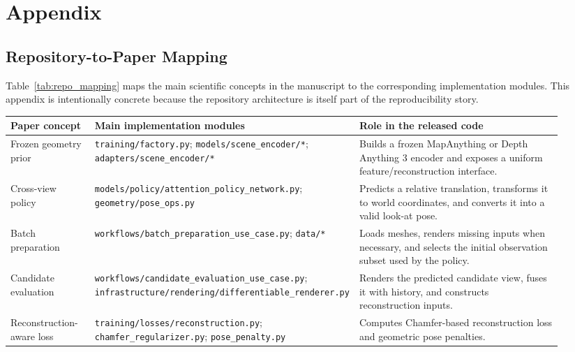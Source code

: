 \section{Appendix}
\label{sec:appendix}

\subsection{Repository-to-Paper Mapping}
\label{sec:repo_mapping}

Table~\ref{tab:repo_mapping} maps the main scientific concepts in the manuscript to the corresponding implementation modules. This appendix is intentionally concrete because the repository architecture is itself part of the reproducibility story.

\begin{table}[h]
    \centering
    \scriptsize
    \begin{tabular}{>{\raggedright\arraybackslash}p{0.16\linewidth} >{\raggedright\arraybackslash}p{0.29\linewidth} >{\raggedright\arraybackslash}p{0.47\linewidth}}
        \toprule
        Paper concept & Main implementation modules & Role in the released code \\
        \midrule
        Frozen geometry prior & \texttt{training/factory.py}; \texttt{models/scene\_encoder/*}; \texttt{adapters/scene\_encoder/*} & Builds a frozen MapAnything or Depth Anything 3 encoder and exposes a uniform feature/reconstruction interface. \\
        Cross-view policy & \texttt{models/policy/attention\_policy\_network.py}; \texttt{geometry/pose\_ops.py} & Predicts a relative translation, transforms it to world coordinates, and converts it into a valid look-at pose. \\
        Batch preparation & \texttt{workflows/batch\_preparation\_use\_case.py}; \texttt{data/*} & Loads meshes, renders missing inputs when necessary, and selects the initial observation subset used by the policy. \\
        Candidate evaluation & \texttt{workflows/candidate\_evaluation\_use\_case.py}; \texttt{infrastructure/rendering/differentiable\_renderer.py} & Renders the predicted candidate view, fuses it with history, and constructs reconstruction inputs. \\
        Reconstruction-aware loss & \texttt{training/losses/reconstruction.py}; \texttt{chamfer\_regularizer.py}; \texttt{pose\_penalty.py} & Computes Chamfer-based reconstruction loss and geometric pose penalties. \\

\end{tabular}
\end{table}
